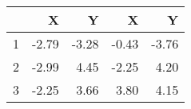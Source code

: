 \begin{tabular}{rrrrr}
  \hline
 & X & Y & X & Y \\ 
  \hline
1 & -2.79 & -3.28 & -0.43 & -3.76 \\ 
  2 & -2.99 & 4.45 & -2.25 & 4.20 \\ 
  3 & -2.25 & 3.66 & 3.80 & 4.15 \\ 
   \hline
\end{tabular}
